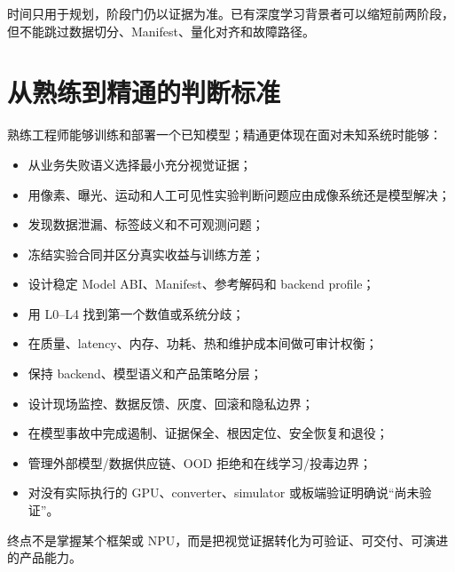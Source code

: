 时间只用于规划，阶段门仍以证据为准。已有深度学习背景者可以缩短前两阶段，但不能跳过数据切分、Manifest、量化对齐和故障路径。

\section{从熟练到精通的判断标准}

熟练工程师能够训练和部署一个已知模型；精通更体现在面对未知系统时能够：

\begin{itemize}
  \item 从业务失败语义选择最小充分视觉证据；
  \item 用像素、曝光、运动和人工可见性实验判断问题应由成像系统还是模型解决；
  \item 发现数据泄漏、标签歧义和不可观测问题；
  \item 冻结实验合同并区分真实收益与训练方差；
  \item 设计稳定 Model ABI、Manifest、参考解码和 backend profile；
  \item 用 L0--L4 找到第一个数值或系统分歧；
  \item 在质量、latency、内存、功耗、热和维护成本间做可审计权衡；
  \item 保持 backend、模型语义和产品策略分层；
  \item 设计现场监控、数据反馈、灰度、回滚和隐私边界；
  \item 在模型事故中完成遏制、证据保全、根因定位、安全恢复和退役；
  \item 管理外部模型/数据供应链、OOD 拒绝和在线学习/投毒边界；
  \item 对没有实际执行的 GPU、converter、simulator 或板端验证明确说“尚未验证”。
\end{itemize}

终点不是掌握某个框架或 NPU，而是把视觉证据转化为可验证、可交付、可演进的产品能力。
